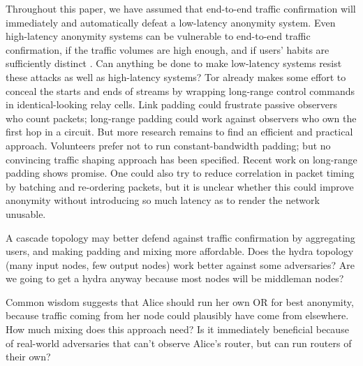 \documentclass[times,10pt,twocolumn]{article}
\begin{document}
Throughout this paper, we have assumed that end-to-end traffic
confirmation will immediately and automatically defeat a low-latency
anonymity system. Even high-latency anonymity systems can be
vulnerable to end-to-end traffic confirmation, if the traffic volumes
are high enough, and if users' habits are sufficiently distinct
\cite{statistical-disclosure,limits-open}. Can anything be done to
make low-latency systems resist these attacks as well as high-latency
systems? Tor already makes some effort to conceal the starts and ends of
streams by wrapping long-range control commands in identical-looking
relay cells. Link padding could frustrate passive observers who count
packets; long-range padding could work against observers who own the
first hop in a circuit. But more research remains to find an efficient
and practical approach. Volunteers prefer not to run constant-bandwidth
padding; but no convincing traffic shaping approach has been
specified. Recent work on long-range padding \cite{defensive-dropping}
shows promise. One could also try to reduce correlation in packet timing
by batching and re-ordering packets, but it is unclear whether this could
improve anonymity without introducing so much latency as to render the
network unusable.

A cascade topology may better defend against traffic confirmation by
aggregating users, and making padding and
mixing more affordable.  Does the hydra topology (many input nodes,
few output nodes) work better against some adversaries? Are we going
to get a hydra anyway because most nodes will be middleman nodes?

Common wisdom suggests that Alice should run her own OR for best
anonymity, because traffic coming from her node could plausibly have
come from elsewhere. How much mixing does this approach need?  Is it
immediately beneficial because of real-world adversaries that can't
observe Alice's router, but can run routers of their own?
\end{document}
